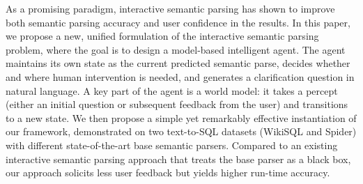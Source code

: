 As a promising paradigm, interactive semantic parsing has shown to improve both semantic parsing accuracy and user confidence in the results. In this paper, we propose a new, unified formulation of the interactive semantic parsing problem, where the goal is to design a model-based intelligent agent. The agent maintains its own state as the current predicted semantic parse, decides whether and where human intervention is needed, and generates a clarification question in natural language. A key part of the agent is a world model: it takes a percept (either an initial question or subsequent feedback from the user) and transitions to a new state. We then propose a simple yet remarkably effective instantiation of our framework, demonstrated on two text-to-SQL datasets (WikiSQL and Spider) with different state-of-the-art base semantic parsers.  Compared to an existing interactive semantic parsing approach that treats the base parser as a black box, our approach solicits less user feedback but yields higher run-time accuracy.